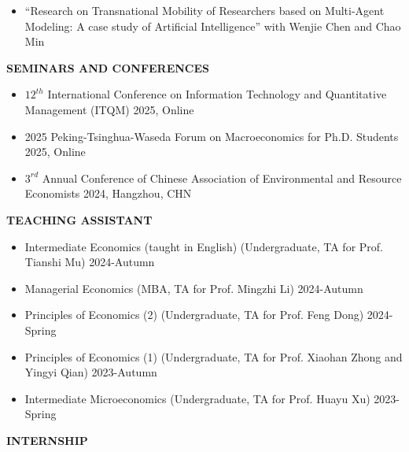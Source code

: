 \documentclass[UTF8]{ctexbook}
\begin{document}
\begin{itemize}
    \item ``Research on Transnational Mobility of Researchers based on Multi-Agent Modeling: A case study of Artificial Intelligence'' with Wenjie Chen and Chao Min
\end{itemize}

\vspace{12pt}

\begin{center}
    \textbf{SEMINARS AND CONFERENCES}
\end{center}

\begin{itemize}
    \item $12^{th}$ International Conference on Information Technology and Quantitative Management (ITQM) \hfill 2025, Online
    \item 2025 Peking-Tsinghua-Waseda Forum on Macroeconomics for Ph.D. Students \hfill 2025, Online
    \item $3^{rd}$ Annual Conference of Chinese Association of Environmental and Resource Economists \hfill 2024, Hangzhou, CHN

\end{itemize}


\vspace{12pt}

\begin{center}
    \textbf{TEACHING ASSISTANT}
\end{center}


\begin{itemize}
    \item Intermediate Economics (taught in English) (Undergraduate, TA for Prof. Tianshi Mu) \hfill 2024-Autumn
    \item Managerial Economics (MBA, TA for Prof. Mingzhi Li) \hfill 2024-Autumn
    \item Principles of Economics (2) (Undergraduate, TA for Prof. Feng Dong) \hfill 2024-Spring
    \item Principles of Economics (1) (Undergraduate, TA for Prof. Xiaohan Zhong and Yingyi Qian) \hfill 2023-Autumn
    \item Intermediate Microeconomics (Undergraduate, TA for Prof. Huayu Xu) \hfill 2023-Spring
\end{itemize}

\vspace{12pt}

\begin{center}
    \textbf{INTERNSHIP}
\end{center}
\end{document}
